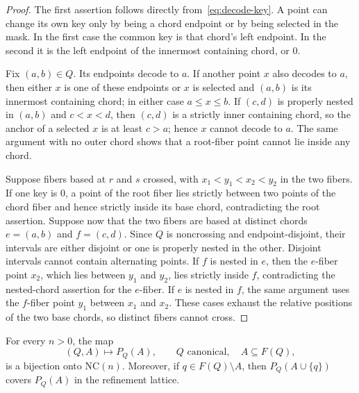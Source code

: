 \documentclass[12pt]{article}
\newcommand{\NC}{\mathrm{NC}}
\begin{document}
\begin{proof}
The first assertion follows directly from~\eqref{eq:decode-key}.  A point can
change its own key only by being a chord endpoint or by being selected in the
mask.  In the first case the common key is that chord's left endpoint.  In
the second it is the left endpoint of the innermost containing chord, or
$0$.

Fix $(a,b)\in Q$.  Its endpoints decode to $a$.  If another point $x$ also
decodes to $a$, then either $x$ is one of these endpoints or $x$ is selected
and $(a,b)$ is its innermost containing chord; in either case $a\leq x\leq b$.
If $(c,d)$ is properly nested in $(a,b)$ and $c<x<d$, then $(c,d)$ is a
strictly inner containing chord, so the anchor of a selected $x$ is at least
$c>a$; hence $x$ cannot decode to $a$.  The same argument with no outer chord
shows that a root-fiber point cannot lie inside any chord.

Suppose fibers based at $r$ and $s$ crossed, with $x_1<y_1<x_2<y_2$ in the
two fibers.  If one key is $0$, a point of the root fiber lies strictly
between two points of the chord fiber and hence strictly inside its base
chord, contradicting the root assertion.  Suppose now that the two fibers are
based at distinct chords $e=(a,b)$ and $f=(c,d)$.  Since $Q$ is noncrossing
and endpoint-disjoint, their intervals are either disjoint or one is properly
nested in the other.  Disjoint intervals cannot contain alternating points.
If $f$ is nested in $e$, then the $e$-fiber point $x_2$, which lies between
$y_1$ and $y_2$, lies strictly inside $f$, contradicting the nested-chord
assertion for the $e$-fiber.  If $e$ is nested in $f$, the same argument uses
the $f$-fiber point $y_1$ between $x_1$ and $x_2$.  These cases exhaust the
relative positions of the two base chords, so distinct fibers cannot cross.
\end{proof}

\begin{theorem}\label{thm:boolean-decomposition}
For every $n>0$, the map
\[
 (Q,A)\longmapsto P_Q(A),
 \qquad Q\text{ canonical},\quad A\subseteq F(Q),
\]
is a bijection onto $\NC(n)$.  Moreover, if $q\in F(Q)\setminus A$, then
$P_Q(A\cup\{q\})$ covers $P_Q(A)$ in the refinement lattice.
\end{theorem}
\end{document}
